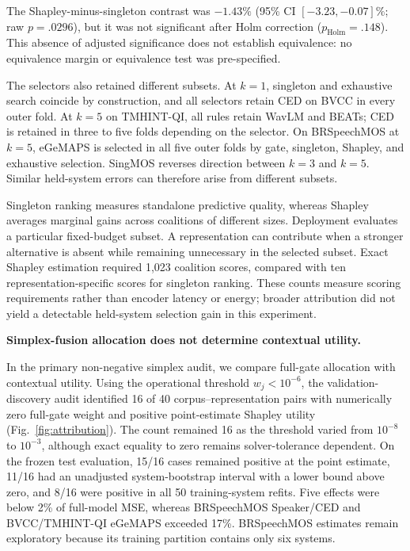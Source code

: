 \documentclass{article}
\begin{document}
The Shapley-minus-singleton contrast was $-1.43\%$ (95\% CI
$[-3.23,-0.07]\%$; raw $p=.0296$), but it was not significant after Holm
correction ($p_{\mathrm{Holm}}=.148$). This absence of adjusted significance
does not establish equivalence: no equivalence margin or equivalence test was
pre-specified.

The selectors also retained different subsets. At $k=1$, singleton and
exhaustive search coincide by construction, and all selectors retain CED on
BVCC in every outer fold. At $k=5$ on TMHINT-QI, all rules retain WavLM and
BEATs; CED is retained in three to five folds depending on the selector. On
BRSpeechMOS at $k=5$, eGeMAPS is selected in all five outer folds by gate,
singleton, Shapley, and exhaustive selection. SingMOS reverses direction
between $k=3$ and $k=5$. Similar held-system errors can therefore arise from
different subsets.

Singleton ranking measures standalone predictive quality, whereas Shapley
averages marginal gains across coalitions of different sizes. Deployment
evaluates a particular fixed-budget subset. A representation can contribute
when a stronger alternative is absent while remaining unnecessary in the
selected subset. Exact Shapley estimation required 1{,}023 coalition scores,
compared with ten representation-specific scores for singleton ranking. These
counts measure scoring requirements rather than encoder latency or energy;
broader attribution did not yield a detectable held-system selection gain in
this experiment.

\textbf{Simplex-fusion allocation does not determine contextual utility.}

In the primary non-negative simplex audit, we compare full-gate allocation with contextual utility. Using the
operational threshold $w_j<10^{-6}$, the validation-discovery audit
identified 16 of 40 corpus--representation pairs with numerically zero
full-gate weight and positive point-estimate Shapley utility
(Fig.~\ref{fig:attribution}). The count remained 16 as the threshold varied
from $10^{-8}$ to $10^{-3}$, although exact equality to zero remains
solver-tolerance dependent. On the frozen test evaluation, 15/16 cases
remained positive at the point estimate, 11/16 had an unadjusted
system-bootstrap interval with a lower bound above zero, and 8/16 were
positive in all 50 training-system refits. Five effects were below 2\% of
full-model MSE, whereas BRSpeechMOS Speaker/CED and BVCC/TMHINT-QI eGeMAPS
exceeded 17\%. BRSpeechMOS estimates remain exploratory because its training
partition contains only six systems.
\end{document}
